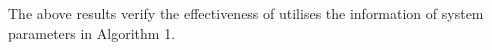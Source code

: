 \documentclass{singlecol-new}
\theoremstyle{TH}{
\newtheorem{lemma}{Lemma}
\newtheorem{theorem}[lemma]{Theorem}
\newtheorem{corrolary}[lemma]{Corrolary}
\newtheorem{conjecture}[lemma]{Conjecture}
\newtheorem{proposition}[lemma]{Proposition}
\newtheorem{claim}[lemma]{Claim}
\newtheorem{stheorem}[lemma]{Wrong Theorem}
\newtheorem{algorithm}{Algorithm}
}
\theoremstyle{THrm}{
\newtheorem{definition}{Definition}[section]
\newtheorem{question}{Question}[section]
\newtheorem{remark}{Remark}
\newtheorem{scheme}{Scheme}
}
\theoremstyle{THhit}{
\newtheorem{case}{Case}[section]
}
\begin{document}


%

\noindent The above results verify the effectiveness of utilises the
information of system parameters in Algorithm 1.


%
\end{document}
